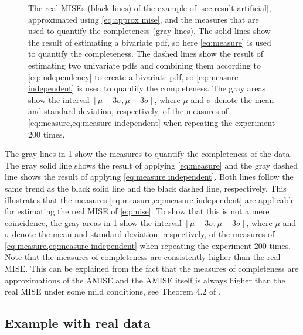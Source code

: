 \setlength{}
\setlength{}
\begin{figure}
	\centering
	
	\caption{The real MISEs (black lines) of the example of \cref{sec:result artificial}, approximated using \cref{eq:approx mise}, and the measures that are used to quantify the completeness (gray lines). The solid lines show the result of estimating a bivariate pdf, so here \cref{eq:measure} is used to quantify the completeness. The dashed lines show the result of estimating two univariate pdfs and combining them according to \cref{eq:independency} to create a bivariate pdf, so \cref{eq:measure independent} is used to quantify the completeness. The gray areas show the interval $[\mu-3\sigma,\mu+3\sigma]$, where $\mu$ and $\sigma$ denote the mean and standard deviation, respectively, of the measures of \cref{eq:measure,eq:measure independent} when repeating the experiment 200 times.} 
	\label{fig:mise example}
\end{figure}

The gray lines in \cref{fig:mise example} show the measures to quantify the completeness of the data. The gray solid line shows the result of applying \cref{eq:measure} and the gray dashed line shows the result of applying \cref{eq:measure independent}. Both lines follow the same trend as the black solid line and the black dashed line, respectively. This illustrates that the measures \cref{eq:measure,eq:measure independent} are applicable for estimating the real MISE of \cref{eq:mise}. To show that this is not a mere coincidence, the gray areas in \cref{fig:mise example} show the interval $[\mu-3\sigma,\mu+3\sigma]$, where $\mu$ and $\sigma$ denote the mean and standard deviation, respectively, of the measures of \cref{eq:measure,eq:measure independent} when repeating the experiment 200 times. Note that the measures of completeness are consistently higher than the real MISE. This can be explained from the fact that the measures of completeness are approximations of the AMISE and the AMISE itself is always higher than the real MISE under some mild conditions, see Theorem 4.2 of \textcite{marron1992exact}.

\subsection{Example with real data}
\label{sec:result real}

